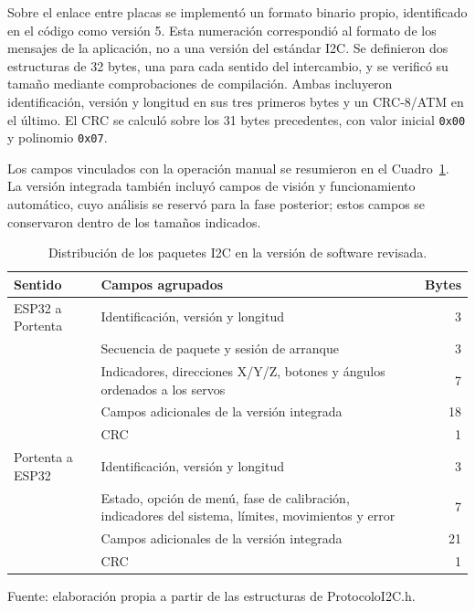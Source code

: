 Sobre el enlace entre placas se implementó un formato binario propio, identificado en el código como versión 5. Esta numeración correspondió al formato de los mensajes de la aplicación, no a una versión del estándar I2C. Se definieron dos estructuras de 32 bytes, una para cada sentido del intercambio, y se verificó su tamaño mediante comprobaciones de compilación. Ambas incluyeron identificación, versión y longitud en sus tres primeros bytes y un CRC-8/ATM en el último. El CRC se calculó sobre los 31 bytes precedentes, con valor inicial \texttt{0x00} y polinomio \texttt{0x07}.

Los campos vinculados con la operación manual se resumieron en el Cuadro~\ref{tab:fase4_paquetes}. La versión integrada también incluyó campos de visión y funcionamiento automático, cuyo análisis se reservó para la fase posterior; estos campos se conservaron dentro de los tamaños indicados.

\begin{table}[H]
    \centering
    \caption{Distribución de los paquetes I2C en la versión de software revisada.}
    \label{tab:fase4_paquetes}
    \begin{tabular}{p{}p{}r}
        \hline
        Sentido & Campos agrupados & Bytes \\
        \hline
        ESP32 a Portenta & Identificación, versión y longitud & 3 \\
        & Secuencia de paquete y sesión de arranque & 3 \\
        & Indicadores, direcciones X/Y/Z, botones y ángulos ordenados a los servos & 7 \\
        & Campos adicionales de la versión integrada & 18 \\
        & CRC & 1 \\
        \hline
        Portenta a ESP32 & Identificación, versión y longitud & 3 \\
        & Estado, opción de menú, fase de calibración, indicadores del sistema, límites, movimientos y error & 7 \\
        & Campos adicionales de la versión integrada & 21 \\
        & CRC & 1 \\
        \hline
    \end{tabular}
    \par\small\raggedright Fuente: elaboración propia a partir de las estructuras de ProtocoloI2C.h.
\end{table}

